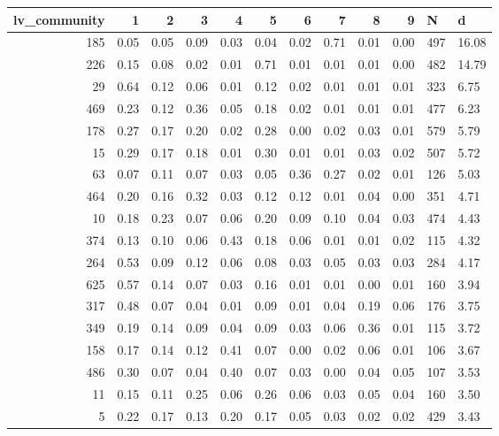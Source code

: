 \begin{tabular}{rrrrrrrrrrll}
\toprule
 lv\_community &    1 &    2 &    3 &    4 &    5 &    6 &    7 &    8 &    9 &   N &     d \\
\midrule
          185 & 0.05 & 0.05 & 0.09 & 0.03 & 0.04 & 0.02 & 0.71 & 0.01 & 0.00 & 497 & 16.08 \\
          226 & 0.15 & 0.08 & 0.02 & 0.01 & 0.71 & 0.01 & 0.01 & 0.01 & 0.00 & 482 & 14.79 \\
           29 & 0.64 & 0.12 & 0.06 & 0.01 & 0.12 & 0.02 & 0.01 & 0.01 & 0.01 & 323 &  6.75 \\
          469 & 0.23 & 0.12 & 0.36 & 0.05 & 0.18 & 0.02 & 0.01 & 0.01 & 0.01 & 477 &  6.23 \\
          178 & 0.27 & 0.17 & 0.20 & 0.02 & 0.28 & 0.00 & 0.02 & 0.03 & 0.01 & 579 &  5.79 \\
           15 & 0.29 & 0.17 & 0.18 & 0.01 & 0.30 & 0.01 & 0.01 & 0.03 & 0.02 & 507 &  5.72 \\
           63 & 0.07 & 0.11 & 0.07 & 0.03 & 0.05 & 0.36 & 0.27 & 0.02 & 0.01 & 126 &  5.03 \\
          464 & 0.20 & 0.16 & 0.32 & 0.03 & 0.12 & 0.12 & 0.01 & 0.04 & 0.00 & 351 &  4.71 \\
           10 & 0.18 & 0.23 & 0.07 & 0.06 & 0.20 & 0.09 & 0.10 & 0.04 & 0.03 & 474 &  4.43 \\
          374 & 0.13 & 0.10 & 0.06 & 0.43 & 0.18 & 0.06 & 0.01 & 0.01 & 0.02 & 115 &  4.32 \\
          264 & 0.53 & 0.09 & 0.12 & 0.06 & 0.08 & 0.03 & 0.05 & 0.03 & 0.03 & 284 &  4.17 \\
          625 & 0.57 & 0.14 & 0.07 & 0.03 & 0.16 & 0.01 & 0.01 & 0.00 & 0.01 & 160 &  3.94 \\
          317 & 0.48 & 0.07 & 0.04 & 0.01 & 0.09 & 0.01 & 0.04 & 0.19 & 0.06 & 176 &  3.75 \\
          349 & 0.19 & 0.14 & 0.09 & 0.04 & 0.09 & 0.03 & 0.06 & 0.36 & 0.01 & 115 &  3.72 \\
          158 & 0.17 & 0.14 & 0.12 & 0.41 & 0.07 & 0.00 & 0.02 & 0.06 & 0.01 & 106 &  3.67 \\
          486 & 0.30 & 0.07 & 0.04 & 0.40 & 0.07 & 0.03 & 0.00 & 0.04 & 0.05 & 107 &  3.53 \\
           11 & 0.15 & 0.11 & 0.25 & 0.06 & 0.26 & 0.06 & 0.03 & 0.05 & 0.04 & 160 &  3.50 \\
            5 & 0.22 & 0.17 & 0.13 & 0.20 & 0.17 & 0.05 & 0.03 & 0.02 & 0.02 & 429 &  3.43 \\

\end{tabular}
